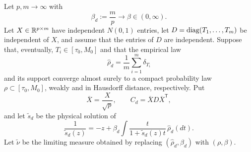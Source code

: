 \begin{proposition}
\label{S:source-input}
Let $p,m\to\infty$ with
\begin{equation}
\beta_d:=\frac mp\longrightarrow\beta\in(0,\infty).
\end{equation}
Let $X\in\mathbb{R}^{p\times m}$ have independent $N(0,1)$ entries, let
$D=\operatorname{diag}(T_1,\ldots,T_m)$ be independent of $X$, and assume that the
entries of $D$ are independent.  Suppose that, eventually,
$T_i\in[\tau_0,M_0]$ and that the empirical law
\begin{equation}
\widehat\rho_d=\frac1m\sum_{i=1}^m\delta_{T_i}
\end{equation}
and its support converge almost surely to a compact probability law
$\rho\subset[\tau_0,M_0]$, weakly and in Hausdorff distance, respectively.
Put
\begin{equation}
\overline X=\frac{X}{\sqrt p},
\qquad
C_d=\overline X D\overline X^{\mathsf T},
\end{equation}
and let $\widetilde s_d$ be the physical solution of
\begin{equation}
\frac1{\widetilde s_d(z)}
=-z+\beta_d\int
\frac{t}{1+\widetilde s_d(z)t}\,\widehat\rho_d(dt).
\label{S:source-input-fixed}
\end{equation}
Let $\widetilde\nu$ be the limiting measure obtained by replacing
$(\widehat\rho_d,\beta_d)$ with $(\rho,\beta)$.


\end{proposition}
